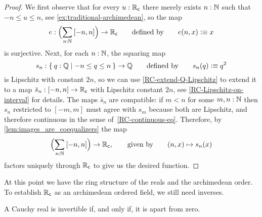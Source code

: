 \begin{proof}
  We first observe that for every $u : \mathbb{R}_\mathsf{c}$ there merely exists $n : \mathbb{N}$ such that $-n
  \leq u \leq n$, see \autoref{ex:traditional-archimedean}, so the map
  \begin{equation*}
    e : \Parens{\sm{n : \N} [-n, n]} \to \RC
    \qquad\text{defined by}\qquad
    e(n, x) \defeq x
  \end{equation*}
  is surjective. Next, for each $n : \mathbb{N}$, the squaring map
  \begin{equation*}
    s_n : \setof{ q : \Q | -n \leq q \leq n } \to \Q
    \qquad\text{defined by}\qquad
    s_n(q) \defeq q^2
  \end{equation*}
  is Lipschitz with constant $2 n$, so we can use \autoref{RC-extend-Q-Lipschitz} to
  extend it to a map $\bar{s}_n : [-n, n] \to \mathbb{R}_\mathsf{c}$ with Lipschitz constant $2 n$, see
  \autoref{RC-Lipschitz-on-interval} for details. The maps $\bar{s}_n$ are compatible: if
  $m < n$ for some $m, n : \mathbb{N}$ then $s_n$ restricted to $[-m, m]$ must agree with $s_m$
  because both are Lipschitz, and therefore continuous in the sense
  of~\autoref{RC-continuous-eq}. Therefore, by \autoref{lem:images_are_coequalizers} the map
  \begin{equation*}
    \Parens{\sm{n : \N} [-n, n]} \to \RC,
    \qquad\text{given by}\qquad
    (n, x) \mapsto s_n(x)
  \end{equation*}
  factors uniquely through $\mathbb{R}_\mathsf{c}$ to give us the desired function.
\end{proof}

At this point we have the ring structure of the reals and the archimedean order. To
establish $\mathbb{R}_\mathsf{c}$ as an archimedean ordered field, we still need inverses.

\begin{thm}
  A Cauchy real is invertible if, and only if, it is apart from zero.
\end{thm}

